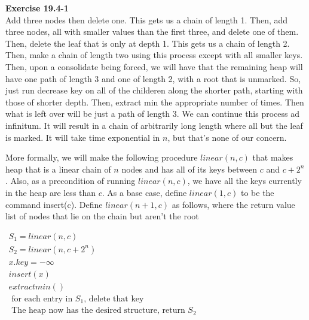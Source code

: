 \documentclass{article}
\begin{document}
\noindent\textbf{Exercise 19.4-1}\\
Add three nodes then delete one. This gets us a chain of length 1. Then, add three nodes, all with smaller values than the first three, and delete one of them. Then, delete the leaf that is only at depth 1. This gets us a chain of length 2. Then, make a chain of length two using this process except with all smaller keys. Then, upon a consolidate being forced, we will have that the remaining heap will have one path of length 3 and one of length 2, with a root that is unmarked. So, just run decrease key on all of the childeren along the shorter path, starting with those of shorter depth. Then, extract min the appropriate number of times. Then what is left over will be just a path of length 3. We can continue this process ad infinitum. It will result in a chain of arbitrarily long length where all but the leaf is marked. It will take time exponential in $n$, but that's none of our concern. 

More formally, we will make the following procedure $linear(n,c)$ that makes heap that is a linear chain of $n$ nodes and has all of its keys between $c$ and $c+2^n$. Also, as a precondition of running $linear(n,c)$, we have all the keys currently in the heap are less than $c$. As a base case, define $linear(1,c)$ to be the command insert(c). Define $linear(n+1,c)$ as follows, where the return value list of nodes that lie on the chain but aren't the root

$
\begin{array}{l}
S_1 = linear(n,c)\\
S_2 = linear(n,c+2^n)\\
x.key = -\infty\\
insert(x)\\
extractmin()\\
\text{ for each entry in $S_1$, delete that key}\\
\text{ The heap now has the desired structure, return $S_2$}\\
\end{array}
$\\
\end{document}
